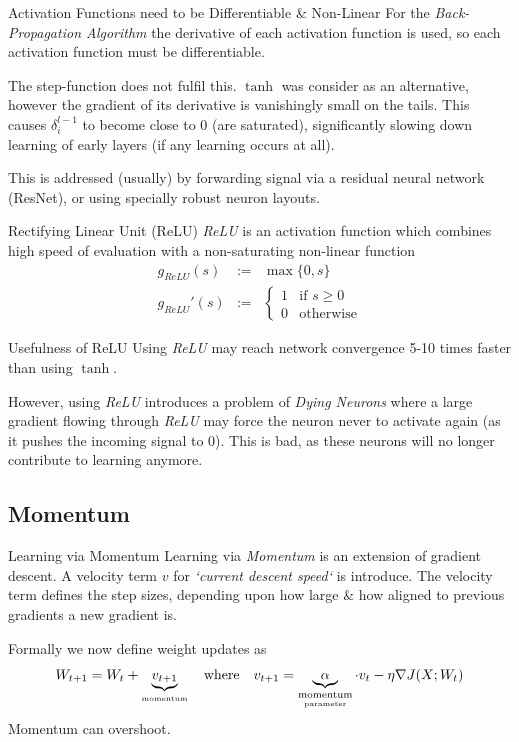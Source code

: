\documentclass[11pt,a4paper]{article}
\begin{document}
  \begin{remark}{Activation Functions need to be Differentiable \& Non-Linear}
    For the \textit{Back-Propagation Algorithm} the derivative of each activation function is used, so each activation function must be differentiable.
    \par The step-function does not fulfil this. $\tanh$ was consider as an alternative, however the gradient of its derivative is vanishingly small on the tails. This causes $\delta_i^{l-1}$ to become close to 0 (are saturated), significantly slowing down learning of early layers (if any learning occurs at all).
    \par This is addressed (usually) by forwarding signal via a residual neural network (ResNet), or using specially robust neuron layouts.
  \end{remark}

  \begin{definition}{Rectifying Linear Unit (ReLU)}
    \textit{ReLU} is an activation function which combines high speed of evaluation with a non-saturating non-linear function
    \[\begin{array}{rcl}
        g_{ReLU}(s)&:=&\max\{0,s\}\\
        g_{ReLU}'(s)&:=&\begin{cases}1&\text{if }s\geq0\\0&\text{otherwise}\end{cases}
    \end{array}\]
  \end{definition}

  \begin{remark}{Usefulness of ReLU}
    Using \textit{ReLU} may reach network convergence 5-10 times faster than using $\tanh$.
    \par However, using \textit{ReLU} introduces a problem of \textit{Dying Neurons} where a large gradient flowing through \textit{ReLU} may force the neuron never to activate again (as it pushes the incoming signal to 0). This is bad, as these neurons will no longer contribute to learning anymore.
  \end{remark}

\subsection{Momentum}

  \begin{proposition}{Learning via Momentum}
    Learning via \textit{Momentum} is an extension of gradient descent. A velocity term $v$ for \textit{`current descent speed`} is introduce. The velocity term defines the step sizes, depending upon how large \& how aligned to previous gradients a new gradient is.
    \par Formally we now define weight updates as
    \[ W_{t+1}=W_t+\underbrace{v_{t+1}}_\text{\tiny momentum}\quad\text{where}\quad v_{t+1}=\underbrace{\alpha}_{ \underset{\text{parameter}}{\text{momentum}}}\cdot v_t-\eta\nabla J(X;W_t) \]
    Momentum can overshoot.
  \end{proposition}
\end{document}
